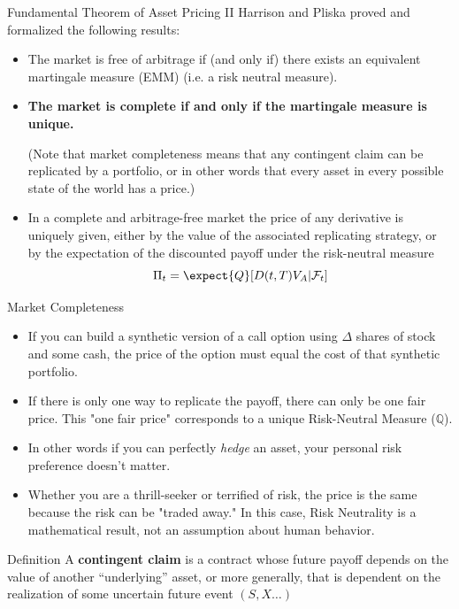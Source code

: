 \documentclass{beamer}
\begin{document}
	{
	\begin{frame}{Fundamental Theorem of Asset Pricing II}
		Harrison and Pliska proved and formalized the following results:
		\begin{itemize}
			\item<0> The market is free of arbitrage if (and only if) there exists an \textcolor{maincolor}{equivalent martingale measure} (EMM) (i.e. a risk neutral measure).
			\item<1-> \textbf{The market is \textcolor{maincolor}{complete} if and only if the martingale measure is unique.}

			(Note that market completeness means that any contingent claim can be replicated by a portfolio, or in other words that every asset in every possible state of the world has a price.)
			\item<0> In a complete and arbitrage-free market the price of any derivative is uniquely given, either by the value of the associated replicating strategy, or by the expectation of the discounted payoff under the risk-neutral measure
			\begin{equation}
				\Pi_t = \expect{Q}[D(t,T)V_A|\mathcal{F}_t]
				\label{eq:risk_neutral_pricing}
			\end{equation}
		\end{itemize}
	\end{frame}
	}

	\begin{frame}{Market Completeness}
		\begin{itemize}
		\item  If you can build a synthetic version of a call option using $\Delta$ shares of stock and some cash, the price of the option must equal the cost of that synthetic portfolio.
		\item If there is only one way to replicate the payoff, there can only be one fair price. This "one fair price" corresponds to a unique Risk-Neutral Measure ($\mathbb{Q}$).
		\item In other words if you can perfectly \emph{hedge} an asset, your personal risk preference doesn't matter.
		\item  Whether you are a thrill-seeker or terrified of risk, the price is the same because the risk can be "traded away." In this case, Risk Neutrality is a mathematical result, not an assumption about human behavior.
	\end{itemize}
	\begin{block}{Definition}
		A \textbf{contingent claim} is a contract whose future payoff depends on the value of another “underlying” asset, or more generally, that is dependent on the realization of some uncertain future event $(S, X\ldots)$
	\end{block}
	\end{frame}
\end{document}
